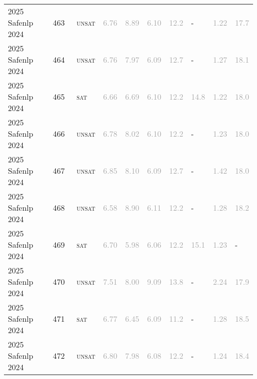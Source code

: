 \begin{center}
{\begin{longtable}{@{}llllllllll@{}}
2025 Safenlp 2024 & 463 & ~\textsc{unsat} & \textcolor{darkgray}{6.76} & \textcolor{darkgray}{8.89} & \textcolor{darkgray}{6.10} & \textcolor{darkgray}{12.2} & - & \textcolor{darkgray}{1.22} & \textcolor{darkgray}{17.7} \\
2025 Safenlp 2024 & 464 & ~\textsc{unsat} & \textcolor{darkgray}{6.76} & \textcolor{darkgray}{7.97} & \textcolor{darkgray}{6.09} & \textcolor{darkgray}{12.7} & - & \textcolor{darkgray}{1.27} & \textcolor{darkgray}{18.1} \\
2025 Safenlp 2024 & 465 & ~\textsc{sat} & \textcolor{darkgray}{6.66} & \textcolor{darkgray}{6.69} & \textcolor{darkgray}{6.10} & \textcolor{darkgray}{12.2} & \textcolor{darkgray}{14.8} & \textcolor{darkgray}{1.22} & \textcolor{darkgray}{18.0} \\
2025 Safenlp 2024 & 466 & ~\textsc{unsat} & \textcolor{darkgray}{6.78} & \textcolor{darkgray}{8.02} & \textcolor{darkgray}{6.10} & \textcolor{darkgray}{12.2} & - & \textcolor{darkgray}{1.23} & \textcolor{darkgray}{18.0} \\
2025 Safenlp 2024 & 467 & ~\textsc{unsat} & \textcolor{darkgray}{6.85} & \textcolor{darkgray}{8.10} & \textcolor{darkgray}{6.09} & \textcolor{darkgray}{12.7} & - & \textcolor{darkgray}{1.42} & \textcolor{darkgray}{18.0} \\
2025 Safenlp 2024 & 468 & ~\textsc{unsat} & \textcolor{darkgray}{6.58} & \textcolor{darkgray}{8.90} & \textcolor{darkgray}{6.11} & \textcolor{darkgray}{12.2} & - & \textcolor{darkgray}{1.28} & \textcolor{darkgray}{18.2} \\
2025 Safenlp 2024 & 469 & ~\textsc{sat} & \textcolor{darkgray}{6.70} & \textcolor{darkgray}{5.98} & \textcolor{darkgray}{6.06} & \textcolor{darkgray}{12.2} & \textcolor{darkgray}{15.1} & \textcolor{darkgray}{1.23} & - \\
2025 Safenlp 2024 & 470 & ~\textsc{unsat} & \textcolor{darkgray}{7.51} & \textcolor{darkgray}{8.00} & \textcolor{darkgray}{9.09} & \textcolor{darkgray}{13.8} & - & \textcolor{darkgray}{2.24} & \textcolor{darkgray}{17.9} \\
2025 Safenlp 2024 & 471 & ~\textsc{sat} & \textcolor{darkgray}{6.77} & \textcolor{darkgray}{6.45} & \textcolor{darkgray}{6.09} & \textcolor{darkgray}{11.2} & - & \textcolor{darkgray}{1.28} & \textcolor{darkgray}{18.5} \\
2025 Safenlp 2024 & 472 & ~\textsc{unsat} & \textcolor{darkgray}{6.80} & \textcolor{darkgray}{7.98} & \textcolor{darkgray}{6.08} & \textcolor{darkgray}{12.2} & - & \textcolor{darkgray}{1.24} & \textcolor{darkgray}{18.4} \\

\end{longtable}}
\end{center}
